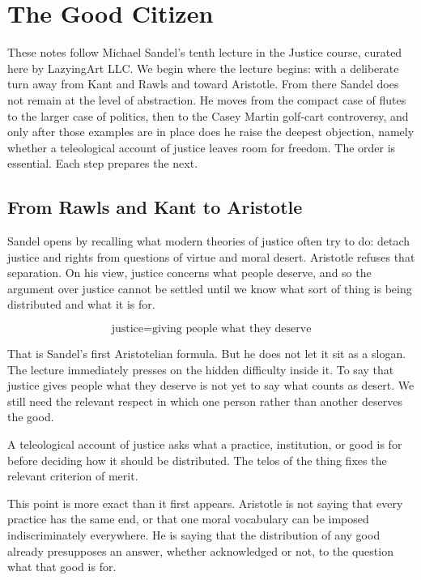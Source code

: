 \chapter{The Good Citizen}

These notes follow Michael Sandel's tenth lecture in the Justice course, curated here by LazyingArt LLC. We begin where the lecture begins: with a deliberate turn away from Kant and Rawls and toward Aristotle. From there Sandel does not remain at the level of abstraction. He moves from the compact case of flutes to the larger case of politics, then to the Casey Martin golf-cart controversy, and only after those examples are in place does he raise the deepest objection, namely whether a teleological account of justice leaves room for freedom. The order is essential. Each step prepares the next.

\section{From Rawls and Kant to Aristotle}

Sandel opens by recalling what modern theories of justice often try to do: detach justice and rights from questions of virtue and moral desert. Aristotle refuses that separation. On his view, justice concerns what people deserve, and so the argument over justice cannot be settled until we know what sort of thing is being distributed and what it is for.

\begin{equation}
\text{justice}=\text{giving people what they deserve}
\end{equation}

That is Sandel's first Aristotelian formula. But he does not let it sit as a slogan. The lecture immediately presses on the hidden difficulty inside it. To say that justice gives people what they deserve is not yet to say what counts as desert. We still need the relevant respect in which one person rather than another deserves the good.

\begin{definition}
A teleological account of justice asks what a practice, institution, or good is for before deciding how it should be distributed. The telos of the thing fixes the relevant criterion of merit.
\end{definition}

This point is more exact than it first appears. Aristotle is not saying that every practice has the same end, or that one moral vocabulary can be imposed indiscriminately everywhere. He is saying that the distribution of any good already presupposes an answer, whether acknowledged or not, to the question what that good is for.

